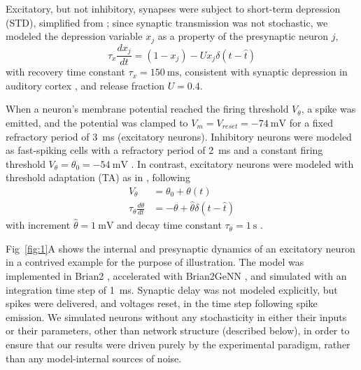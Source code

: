 \documentclass[10pt,letterpaper]{article}
\newcommand{\FIG}[1]{Fig~\ref{fig:#1}}
\begin{document}
Excitatory, but not inhibitory, synapses were subject to short-term depression (STD), simplified from \cite{Tsodyks1997-qt}; since synaptic transmission was not stochastic, we modeled the depression variable $x_j$ as a property of the presynaptic neuron $j$,
\begin{equation}
    \tau_x \frac{dx_j}{dt} = (1-x_j) - U x_j \delta(t - \hat{t}) \label{eq:xsyn}
\end{equation}
with recovery time constant $\tau_x = \qty{150}{\milli\second}$, consistent with synaptic depression in auditory cortex \cite{David2013-cw,Pennington2020-ua}, and release fraction $U = 0.4$.

When a neuron's membrane potential reached the firing threshold $V_\theta$, a spike was emitted, and the potential was clamped to $V_m = V_{reset} = \qty{-74}{\milli\volt}$ for a fixed refractory period of \qty{3}{\milli\second} (excitatory neurons). Inhibitory neurons were modeled as fast-spiking cells with a refractory period of \qty{2}{\milli\second} and a constant firing threshold $V_\theta = \theta_0 = \qty{-54}{\milli\volt}$ \cite{Mensi2012-au}. In contrast, excitatory neurons were modeled with threshold adaptation (TA) as in \cite{Teeter2018-iz}, following
\begin{align}
    V_\theta &= \theta_0 + \theta(t) \nonumber \\
    \tau_{\theta} \frac{d\theta}{dt} &= -\theta + \hat{\theta} \delta(t - \hat{t}) \label{eq:TA}
\end{align}
with increment $\hat{\theta} = \qty{1}{\milli\volt}$ and decay time constant $\tau_{\theta} = \qty{1}{\second}$ \cite{Schwindt1989-lv, Fleidervish1996-ly, Sanchez-Vives2000-rv, La_Camera2006-dz}.

\FIG{1}A shows the internal and presynaptic dynamics of an excitatory neuron in a contrived example for the purpose of illustration. The model was implemented in Brian2 \cite{Stimberg2019-tc}, accelerated with Brian2GeNN \cite{Stimberg2020-go}, and simulated with an integration time step of \qty{1}{\milli\second}. Synaptic delay was not modeled explicitly, but spikes were delivered, and voltages reset, in the time step following spike emission. We simulated neurons without any stochasticity in either their inputs or their parameters, other than network structure (described below), in order to ensure that our results were driven purely by the experimental paradigm, rather than any model-internal sources of noise.
\end{document}
